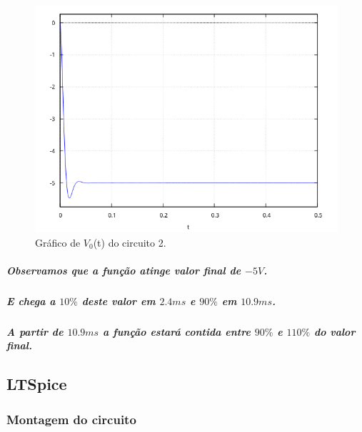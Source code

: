 \documentclass[12pt,twoside, a4paper, twocolumn]{article}
\begin{document}
\begin{figure}[h]
    \centering
    \includegraphics[width=1\columnwidth]{images/graficoH2t.png}
    \caption{Gráfico de $V_0$(t) do circuito 2.}
\end{figure}




\subparagraph*{Observamos que a função atinge valor final de $-5V$.}




\subparagraph*{E chega a $10\%$ deste valor em $2.4ms$ e $90\%$ em $10.9ms$.}




\subparagraph*{A partir de $10.9ms$ a função estará contida entre $90\%$ e $110\%$ do valor final.}












\newpage
















\subsection{LTSpice}




\subsubsection{Montagem do circuito}
\end{document}
